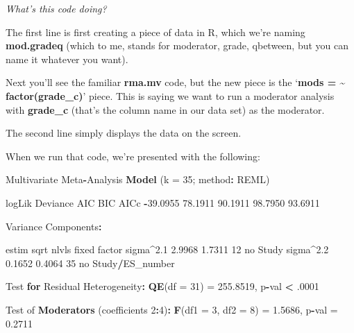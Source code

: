\documentclass[
]{book}
\newenvironment{Shaded}{\begin{snugshade}}{\end{snugshade}}
\newcommand{\AttributeTok}[1]{\textcolor[rgb]{0.13,0.29,0.53}{#1}}
\newcommand{\ControlFlowTok}[1]{\textcolor[rgb]{0.13,0.29,0.53}{\textbf{#1}}}
\newcommand{\DecValTok}[1]{\textcolor[rgb]{0.00,0.00,0.81}{#1}}
\newcommand{\FloatTok}[1]{\textcolor[rgb]{0.00,0.00,0.81}{#1}}
\newcommand{\FunctionTok}[1]{\textcolor[rgb]{0.13,0.29,0.53}{\textbf{#1}}}
\newcommand{\NormalTok}[1]{#1}
\newcommand{\OtherTok}[1]{\textcolor[rgb]{0.56,0.35,0.01}{#1}}
\newcommand{\SpecialCharTok}[1]{\textcolor[rgb]{0.81,0.36,0.00}{\textbf{#1}}}
\begin{document}
\emph{What's this code doing?}

The first line is first creating a piece of data in R, which we're naming \textbf{mod.gradeq} (which to me, stands for moderator, grade, qbetween, but you can name it whatever you want).

Next you'll see the familiar \textbf{rma.mv} code, but the new piece is the `\textbf{mods = \textasciitilde{} factor(grade\_c)}' piece. This is saying we want to run a moderator analysis with \textbf{grade\_c} (that's the column name in our data set) as the moderator.

The second line simply displays the data on the screen.

When we run that code, we're presented with the following:

\begin{Shaded}
\begin{Highlighting}[]
\NormalTok{Multivariate Meta}\SpecialCharTok{{-}}\NormalTok{Analysis }\FunctionTok{Model}\NormalTok{ (}\AttributeTok{k =} \DecValTok{35}\NormalTok{; method}\SpecialCharTok{:}\NormalTok{ REML)}

\NormalTok{  logLik  Deviance       AIC       BIC      AICc   }
\SpecialCharTok{{-}}\FloatTok{39.0955}   \FloatTok{78.1911}   \FloatTok{90.1911}   \FloatTok{98.7950}   \FloatTok{93.6911}   

\NormalTok{Variance Components}\SpecialCharTok{:}

\NormalTok{            estim    sqrt  nlvls  fixed           factor }
\NormalTok{sigma}\SpecialCharTok{\^{}}\FloatTok{2.1}  \FloatTok{2.9968}  \FloatTok{1.7311}     \DecValTok{12}\NormalTok{     no            Study }
\NormalTok{sigma}\SpecialCharTok{\^{}}\FloatTok{2.2}  \FloatTok{0.1652}  \FloatTok{0.4064}     \DecValTok{35}\NormalTok{     no  Study}\SpecialCharTok{/}\NormalTok{ES\_number }

\NormalTok{Test }\ControlFlowTok{for}\NormalTok{ Residual Heterogeneity}\SpecialCharTok{:}
\FunctionTok{QE}\NormalTok{(}\AttributeTok{df =} \DecValTok{31}\NormalTok{) }\OtherTok{=} \FloatTok{255.8519}\NormalTok{, p}\SpecialCharTok{{-}}\NormalTok{val }\SpecialCharTok{\textless{}}\NormalTok{ .}\DecValTok{0001}

\NormalTok{Test of }\FunctionTok{Moderators}\NormalTok{ (coefficients }\DecValTok{2}\SpecialCharTok{:}\DecValTok{4}\NormalTok{)}\SpecialCharTok{:}
\FunctionTok{F}\NormalTok{(}\AttributeTok{df1 =} \DecValTok{3}\NormalTok{, }\AttributeTok{df2 =} \DecValTok{8}\NormalTok{) }\OtherTok{=} \FloatTok{1.5686}\NormalTok{, p}\SpecialCharTok{{-}}\NormalTok{val }\OtherTok{=} \FloatTok{0.2711}


\end{Highlighting}
\end{Shaded}
\end{document}
